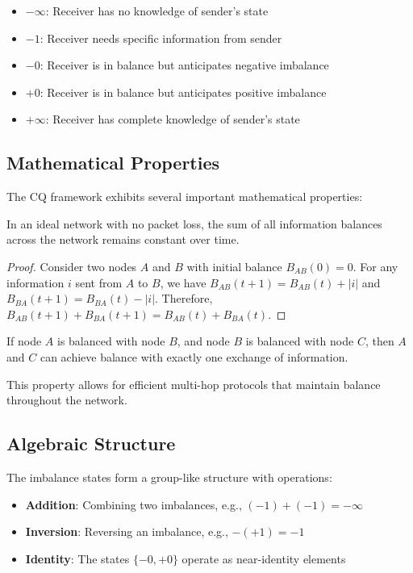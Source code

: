 \documentclass[../OAE-SPEC-MAIN.tex]{subfiles}
\begin{document}
\begin{itemize}
    \item $-\infty$: Receiver has no knowledge of sender's state
    \item $-1$: Receiver needs specific information from sender
    \item $-0$: Receiver is in balance but anticipates negative imbalance
    \item $+0$: Receiver is in balance but anticipates positive imbalance
    \item $+\infty$: Receiver has complete knowledge of sender's state
\end{itemize}

\subsection{Mathematical Properties}

The CQ framework exhibits several important mathematical properties:

\begin{highlightbox}
In an ideal network with no packet loss, the sum of all information balances across the network remains constant over time.
\end{highlightbox}

\begin{proof}
Consider two nodes $A$ and $B$ with initial balance $B_{AB}(0) = 0$. For any information $i$ sent from $A$ to $B$, we have $B_{AB}(t+1) = B_{AB}(t) + |i|$ and $B_{BA}(t+1) = B_{BA}(t) - |i|$. Therefore, $B_{AB}(t+1) + B_{BA}(t+1) = B_{AB}(t) + B_{BA}(t)$.
\end{proof}

\begin{highlightbox}
If node $A$ is balanced with node $B$, and node $B$ is balanced with node $C$, then $A$ and $C$ can achieve balance with exactly one exchange of information.
\end{highlightbox}

This property allows for efficient multi-hop protocols that maintain balance throughout the network.

\subsection{Algebraic Structure}

The imbalance states form a group-like structure with operations:

\begin{itemize}
    \item \textbf{Addition}: Combining two imbalances, e.g., $(-1) + (-1) = -\infty$
    \item \textbf{Inversion}: Reversing an imbalance, e.g., $-(+1) = -1$
    \item \textbf{Identity}: The states $\{-0, +0\}$ operate as near-identity elements
\end{itemize}
\end{document}
